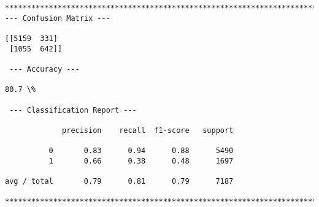 \documentclass[11pt]{article}
\begin{document}
    \begin{Verbatim}[commandchars=\\\{\}]
*******************************************************************************************
--- Confusion Matrix ---

[[5159  331]
 [1055  642]]

 --- Accuracy ---

80.7 \%

 --- Classification Report ---

             precision    recall  f1-score   support

          0       0.83      0.94      0.88      5490
          1       0.66      0.38      0.48      1697

avg / total       0.79      0.81      0.79      7187

*******************************************************************************************

    \end{Verbatim}


    
    
    
    
\end{document}
